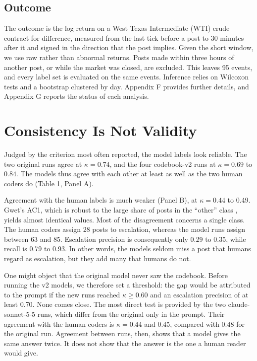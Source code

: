 \documentclass[12pt]{article}
\begin{document}
\subsection{Outcome}
The outcome is the log return on a West Texas Intermediate (WTI) crude contract for difference, measured from the last tick before a post to 30 minutes after it and signed in the direction that the post implies. Given the short window, we use raw rather than abnormal returns. Posts made within three hours of another post, or while the market was closed, are excluded. This leaves 95 events, and every label set is evaluated on the same events. Inference relies on Wilcoxon tests and a bootstrap clustered by day. Appendix F provides further details, and Appendix G reports the status of each analysis.

\section{Consistency Is Not Validity}

Judged by the criterion most often reported, the model labels look reliable. The two original runs agree at $\kappa = 0.74$, and the four codebook-v2 runs at $\kappa = 0.69$ to $0.84$. The models thus agree with each other at least as well as the two human coders do (Table 1, Panel A).

Agreement with the human labels is much weaker (Panel B), at $\kappa = 0.44$ to 0.49. Gwet's AC1, which is robust to the large share of posts in the ``other'' class \citep{gwet2008}, yields almost identical values. Most of the disagreement concerns a single class. The human coders assign 28 posts to escalation, whereas the model runs assign between 63 and 85. Escalation precision is consequently only 0.29 to 0.35, while recall is 0.79 to 0.93. In other words, the models seldom miss a post that humans regard as escalation, but they add many that humans do not.

One might object that the original model never saw the codebook. Before running the v2 models, we therefore set a threshold: the gap would be attributed to the prompt if the new runs reached $\kappa \geq 0.60$ and an escalation precision of at least 0.70. None comes close. The most direct test is provided by the two claude-sonnet-5-5 runs, which differ from the original only in the prompt. Their agreement with the human coders is $\kappa = 0.44$ and 0.45, compared with 0.48 for the original run. Agreement between runs, then, shows that a model gives the same answer twice. It does not show that the answer is the one a human reader would give.
\end{document}
